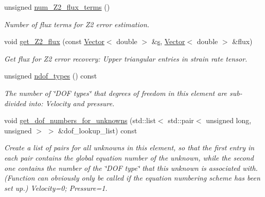 \begin{DoxyCompactItemize}
unsigned \hyperlink{classoomph_1_1GeneralisedNewtonianAxisymmetricTCrouzeixRaviartElement_a2e704b1a8816bbf86dba405aae9327f1}{num\+\_\+\+Z2\+\_\+flux\+\_\+terms} ()
\begin{DoxyCompactList}\small\item\em Number of \textquotesingle{}flux\textquotesingle{} terms for Z2 error estimation. \end{DoxyCompactList}\item 
void \hyperlink{classoomph_1_1GeneralisedNewtonianAxisymmetricTCrouzeixRaviartElement_a8440a0c7aab6c6f4095d06b0063842ca}{get\+\_\+\+Z2\+\_\+flux} (const \hyperlink{classoomph_1_1Vector}{Vector}$<$ double $>$ \&\hyperlink{cfortran_8h_ab7123126e4885ef647dd9c6e3807a21c}{s}, \hyperlink{classoomph_1_1Vector}{Vector}$<$ double $>$ \&flux)
\begin{DoxyCompactList}\small\item\em Get \textquotesingle{}flux\textquotesingle{} for Z2 error recovery\+: Upper triangular entries in strain rate tensor. \end{DoxyCompactList}\item 
unsigned \hyperlink{classoomph_1_1GeneralisedNewtonianAxisymmetricTCrouzeixRaviartElement_a887f4ea8bcd6775f6b19d326409a8bd2}{ndof\+\_\+types} () const
\begin{DoxyCompactList}\small\item\em The number of \char`\"{}\+D\+O\+F types\char`\"{} that degrees of freedom in this element are sub-\/divided into\+: Velocity and pressure. \end{DoxyCompactList}\item 
void \hyperlink{classoomph_1_1GeneralisedNewtonianAxisymmetricTCrouzeixRaviartElement_ab6a2ceec6d99232bb562a1c468490367}{get\+\_\+dof\+\_\+numbers\+\_\+for\+\_\+unknowns} (std\+::list$<$ std\+::pair$<$ unsigned long, unsigned $>$ $>$ \&dof\+\_\+lookup\+\_\+list) const
\begin{DoxyCompactList}\small\item\em Create a list of pairs for all unknowns in this element, so that the first entry in each pair contains the global equation number of the unknown, while the second one contains the number of the \char`\"{}\+D\+O\+F type\char`\"{} that this unknown is associated with. (Function can obviously only be called if the equation numbering scheme has been set up.) Velocity=0; Pressure=1. \end{DoxyCompactList}\end{DoxyCompactItemize}
